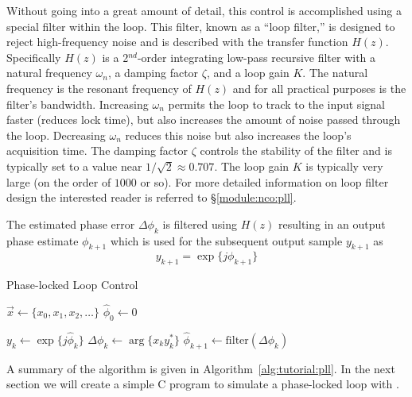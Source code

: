 Without going into a great amount of detail, this control is
accomplished using a special filter within the loop.
This filter, known as a ``loop filter,'' is designed to reject
high-frequency noise and is described with the transfer function $H(z)$.
Specifically $H(z)$ is a 2$^{nd}$-order integrating low-pass recursive
filter with
a natural frequency $\omega_n$,
a damping factor $\zeta$, and
a loop gain $K$.
The natural frequency is the resonant frequency of $H(z)$ and for all
practical purposes is the filter's bandwidth.
Increasing $\omega_n$ permits the loop to track to the input signal
faster (reduces lock time), but also increases the amount of noise
passed through the loop.
Decreasing $\omega_n$ reduces this noise but also increases the loop's
acquisition time.
The damping factor $\zeta$ controls the stability of the filter and is
typically set to a value near $1/\sqrt{2} \approx 0.707$.
The loop gain $K$ is typically very large
(on the order of $1000$ or so).
For more detailed information on loop filter design the interested
reader is referred to \S\ref{module:nco:pll}.

The estimated phase error $\Delta\phi_k$ is filtered using $H(z)$
resulting in an output phase estimate $\phi_{k+1}$
which is used for the subsequent output sample $y_{k+1}$ as
%
\begin{equation}
\label{eqn:tutoral:pll:y1}
    y_{k+1} = \exp\bigl\{ j\phi_{k+1} \bigr\}
\end{equation}
%
\begin{algorithm}[H]
\caption{Phase-locked Loop Control}
\label{alg:tutorial:pll}
\begin{algorithmic}[1]
\STATE $\vec{x} \leftarrow \{x_0,x_1,x_2,\ldots\}$    
\STATE $\hat{\phi}_0 \leftarrow 0$          

    \STATE $y_k \leftarrow \exp\bigl\{ j\hat{\phi}_k \bigr\}$ 
    \STATE $\Delta\phi_k \leftarrow \arg\bigl\{ x_k y_k^* \bigr\}$ 
    \STATE $\hat{\phi}_{k+1} \leftarrow \text{filter}(\Delta\phi_k)$ 
\ENDFOR
\end{algorithmic}
\end{algorithm}
%
A summary of the algorithm is given in Algorithm~\ref{alg:tutorial:pll}.
In the next section we will create a simple C program to simulate a
phase-locked loop with \liquid.


